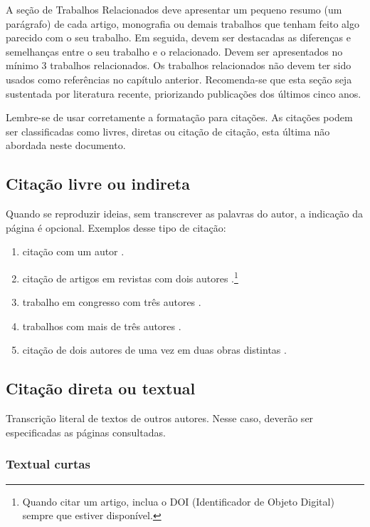 A seção de Trabalhos Relacionados deve apresentar um pequeno resumo (um parágrafo) de cada artigo, monografia ou demais trabalhos que tenham feito algo parecido com o seu trabalho. Em seguida, devem ser destacadas as diferenças e semelhanças entre o seu trabalho e o relacionado. Devem ser apresentados no mínimo 3 trabalhos relacionados. Os trabalhos relacionados não devem ter sido usados como referências no capítulo anterior. Recomenda-se que esta seção seja sustentada por literatura recente, priorizando publicações dos últimos cinco anos.

Lembre-se de usar corretamente a formatação para citações. As citações podem ser classificadas como livres, diretas ou citação de citação, esta última não abordada neste documento.


\subsection{\esp Citação livre ou indireta}

Quando se reproduzir ideias, sem transcrever as palavras do autor, a indicação da página é opcional. Exemplos desse tipo de citação:
\begin{enumerate} 
 \item citação com um autor \cite{knuth1968}. 
 \item citação de artigos em revistas com dois autores \cite{prenner2022}.\footnote{Quando citar um artigo, inclua o DOI (Identificador de Objeto Digital) sempre que estiver disponível.}
  \item trabalho em congresso com três autores \cite{vasconcelos2016}.
 \item trabalhos com mais de três autores \cite{cap-livro2005}.
 \item citação de dois autores de uma vez em duas obras distintas \cite{gil2022,groupp2003}.
\end{enumerate}

\subsection{\esp Citação direta ou textual}

Transcrição literal de textos de outros autores. Nesse caso, deverão ser especificadas as páginas consultadas. 


\subsubsection{\esp Textual curtas}

